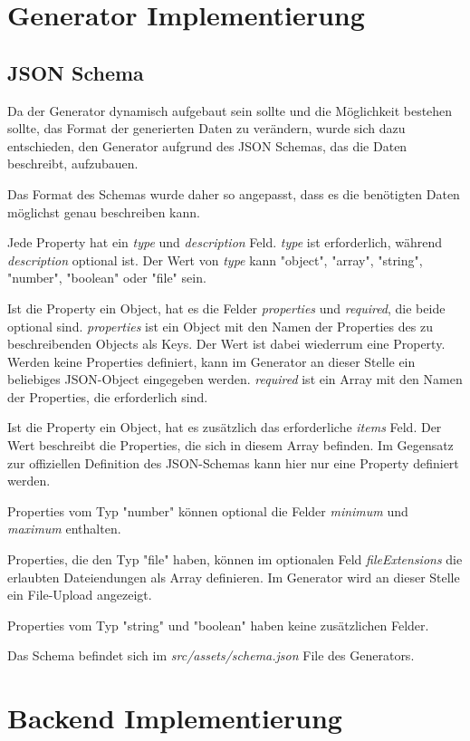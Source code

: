\section{Generator Implementierung}
\subsection{JSON Schema}
Da der Generator dynamisch aufgebaut sein sollte und die Möglichkeit bestehen sollte, das Format der generierten
Daten zu verändern, wurde sich dazu entschieden, den Generator aufgrund des JSON Schemas, das die Daten beschreibt,
aufzubauen.

Das Format des Schemas wurde daher so angepasst, dass es die benötigten Daten möglichst genau beschreiben kann.

Jede Property hat ein \textit{type} und \textit{description} Feld.
\textit{type} ist erforderlich, während \textit{description} optional ist.
Der Wert von \textit{type} kann "object", "array", "string", "number", "boolean" oder "file" sein.

Ist die Property ein Object, hat es die Felder \textit{properties} und \textit{required}, die beide optional sind.
\textit{properties} ist ein Object mit den Namen der Properties des zu beschreibenden Objects als Keys.
Der Wert ist dabei wiederrum eine Property.
Werden keine Properties definiert, kann im Generator an dieser Stelle ein beliebiges JSON-Object eingegeben werden.
\textit{required} ist ein Array mit den Namen der Properties, die erforderlich sind.

Ist die Property ein Object, hat es zusätzlich das erforderliche \textit{items} Feld.
Der Wert beschreibt die Properties, die sich in diesem Array befinden.
Im Gegensatz zur offiziellen Definition des JSON-Schemas kann hier nur eine Property definiert werden.

Properties vom Typ "number" können optional die Felder \textit{minimum} und \textit{maximum} enthalten.

Properties, die den Typ "file" haben, können im optionalen Feld \textit{fileExtensions} die erlaubten
Dateiendungen als Array definieren.
Im Generator wird an dieser Stelle ein File-Upload angezeigt.

Properties vom Typ "string" und "boolean" haben keine zusätzlichen Felder.

Das Schema befindet sich im \textit{src/assets/schema.json} File des Generators.

\section{Backend Implementierung}

